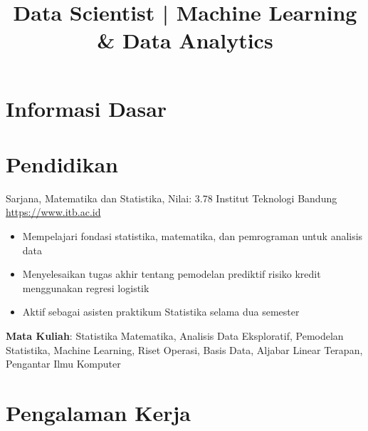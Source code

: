 \documentclass[a4paper, serif, 10pt]{moderncv}
\title{Data Scientist | Machine Learning \& Data Analytics}
\begin{document}
\maketitle

\section{Informasi Dasar}

\section{Pendidikan}

        {Sarjana, Matematika dan Statistika, Nilai: 3.78}
        {Institut Teknologi Bandung}
        {\url{https://www.itb.ac.id}}
        {}
        {\begin{itemize}
\item Mempelajari fondasi statistika, matematika, dan pemrograman untuk analisis data
\item Menyelesaikan tugas akhir tentang pemodelan prediktif risiko kredit menggunakan regresi logistik
\item Aktif sebagai asisten praktikum Statistika selama dua semester
\end{itemize}
\textbf{Mata Kuliah}: Statistika Matematika, Analisis Data Eksploratif, Pemodelan Statistika, Machine Learning, Riset Operasi, Basis Data, Aljabar Linear Terapan, Pengantar Ilmu Komputer}
\section{Pengalaman Kerja}
\end{document}
